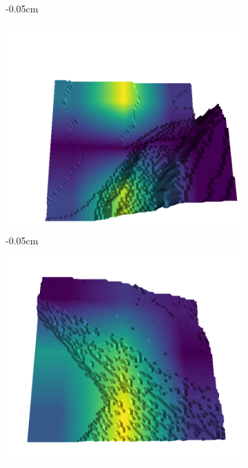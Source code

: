 \documentclass[../document.tex]{subfiles}
\begin{document}
\begin{figure}[H]
\begin{subfigure}[b]{0.242\linewidth}
        \caption{-0.05cm}
        \end{subfigure}
        \begin{subfigure}[b]{0.242\linewidth}
        \includegraphics[width=\linewidth]{../img/5/quarry/false_negative/07-patch-3d-majavi-colormap-50.png}
        \caption{-0.05cm}
        \end{subfigure}
        \begin{subfigure}[b]{0.242\linewidth}
        \includegraphics[width=\linewidth]{../img/5/quarry/false_negative/08-patch-3d-majavi-colormap-55.png}

\end{subfigure}
\end{figure}
\end{document}
